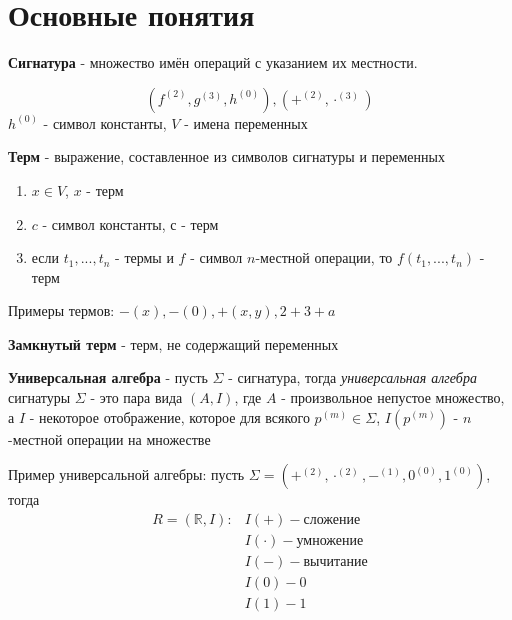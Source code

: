 \documentclass{article}
\begin{document}


\section{Основные понятия}
\begin{dfn}
\textbf{Сигнатура} - множество имён операций с указанием их местности.

$$(f^{(2)},g^{(3)},h^{(0)}), (+^{(2)},\cdot^{(3)})$$
$h^{(0)}$ - символ константы,
$V$ - имена переменных
\end{dfn}

\begin{dfn}
\textbf{Терм} - выражение, составленное из символов сигнатуры и переменных

\begin{enumerate}
\item $x\in V$, $x$ - терм
\item $c$ - символ константы, с - терм
\item если $t_1,...,t_n$ - термы и $f$ - символ $n$-местной операции, то $f(t_1,...,t_n)$ - терм
\end{enumerate}
\end{dfn}

\begin{exm}
Примеры термов: $-(x),-(0),+(x,y),2+3+a$
\end{exm}

\begin{dfn}
\textbf{Замкнутый терм} - терм, не содержащий переменных
\end{dfn}

\begin{dfn}
\textbf{Универсальная алгебра} - пусть $\Sigma$ - сигнатура, тогда \textit{универсальная алгебра} сигнатуры $\Sigma$ - это пара вида $(A,I)$, где $A$ - произвольное непустое множество, а $I$ - некоторое отображение, которое для всякого $p^{(m)}\in \Sigma$, $I(p^{(m)})$ - $n$-местной операции на множестве
\end{dfn}

\begin{exm}
Пример универсальной алгебры: пусть $\Sigma=(+^{(2)},\cdot^{(2)},-^{(1)},0^{(0)},1^{(0)})$, тогда
\begin{equation*}
\begin{split}
R=(\mathbb{R},I) :& I(+) - \text{сложение}\\
& I(\cdot) - \text{умножение}\\
& I(-) - \text{вычитание}\\
& I(0) - 0\\
& I(1) - 1
\end{split}
\end{equation*}
\end{exm}
\end{document}
